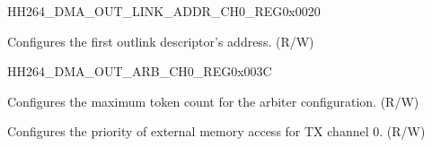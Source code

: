 \begin{register}{H}{H264\_DMA\_OUT\_LINK\_ADDR\_CH0\_REG}{0x0020}\label{regdesc:H264DMAOUTLINKADDRCH0REG}
%
\regnewline%
\begin{regdesc}\begin{reglist}
\label{fielddesc:H264DMAOUTLINKADDRCH0}\item [H264\_DMA\_OUTLINK\_ADDR\_CH0] Configures the first outlink descriptor's address. (R/W)
\end{reglist}\end{regdesc}
\end{register}

\begin{register}{H}{H264\_DMA\_OUT\_ARB\_CH0\_REG}{0x003C}\label{regdesc:H264DMAOUTARBCH0REG}
%
%
%
\regnewline%
\begin{regdesc}\begin{reglist}
\label{fielddesc:H264DMAOUTARBTOKENNUMCH0}\item [H264\_DMA\_OUT\_ARB\_TOKEN\_NUM\_CH0] Configures the maximum token count for the arbiter configuration. (R/W)
\label{fielddesc:H264DMAEXTEROUTARBPRIORITYCH0}\item [H264\_DMA\_EXTER\_OUT\_ARB\_PRIORITY\_CH0] Configures the priority of external memory access for TX channel 0. (R/W)
\end{reglist}\end{regdesc}
\end{register}


